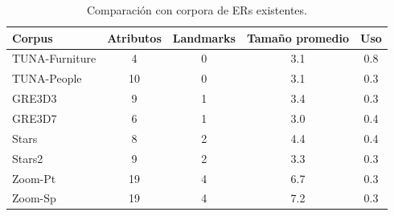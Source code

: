 \begin{table}[H]
\begin{center}
\footnotesize{

\begin{tabular} {  l c c c c}
\hline
Corpus											& Atributos			& Landmarks			& Tama\~{n}o promedio	& Uso \\
\hline
TUNA-Furniture							& 4								& 0							& 3.1				& 0.8   \\
TUNA-People									& 10							& 0							& 3.1				& 0.3   \\
GRE3D3											& 9								& 1							& 3.4				& 0.3   \\
GRE3D7											& 6								& 1							& 3.0				& 0.4   \\
Stars												& 8								& 2							& 4.4				& 0.4   \\
Stars2											& 9								& 2							& 3.3				& 0.3   \\
Zoom-Pt											& 19							& 4							& 6.7				& 0.3   \\
Zoom-Sp											& 19							& 4							& 7.2				& 0.3   \\
\hline
\end{tabular}
}
\end{center}
\caption{Comparaci\'on con corpora de ERs existentes.}
\label{tab-comparison}
\end{table}



%
%

